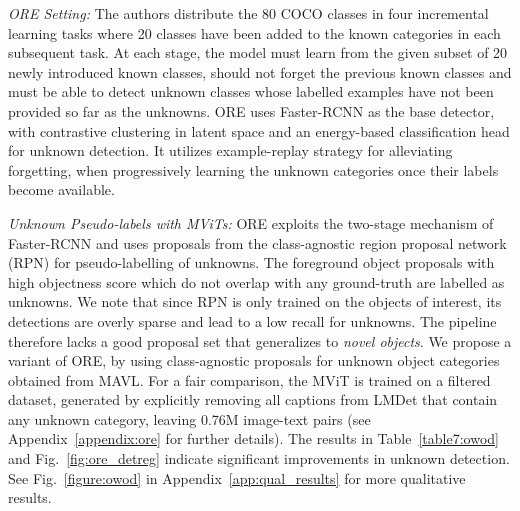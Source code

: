 \documentclass[runningheads]{llncs}
\begin{document}
\noindent
\textit{ORE Setting:} The authors distribute the 80 COCO \cite{coco} classes in four incremental learning tasks where 20 classes have been added to the known categories in each subsequent task. At each stage, the model must learn from the given subset of 20 newly introduced known classes, should not forget the previous known classes and must be able to detect unknown classes whose labelled examples have not been provided so far as the unknowns. ORE uses Faster-RCNN \cite{ren2015faster} as the base detector, with contrastive clustering in latent space and an energy-based classification head for unknown detection. It utilizes example-replay strategy \cite{wang2020frustratingly} for alleviating forgetting, when progressively learning the unknown categories once their labels become available. 

\noindent
\textit{Unknown Pseudo-labels with MViTs:} ORE exploits the two-stage mechanism of Faster-RCNN \cite{ren2015faster} and uses proposals from the class-agnostic region proposal network (RPN) for pseudo-labelling of unknowns. The foreground object proposals with high objectness score which do not overlap with any ground-truth are labelled as unknowns. We note that since RPN is only trained on the objects of interest, its detections are overly sparse and lead to a low recall for unknowns. The pipeline therefore lacks a good proposal set that generalizes to \emph{novel objects}. We propose a variant of ORE, by using class-agnostic proposals for unknown object categories obtained from MAVL. For a fair comparison, the MViT is trained on a filtered dataset, generated by explicitly removing all captions from LMDet that contain any unknown category, leaving 0.76M image-text pairs {(see Appendix~\ref{appendix:ore} for further details)}. The results in Table~\ref{table7:owod} and Fig.~\ref{fig:ore_detreg} indicate significant improvements in unknown detection. {See Fig.~\ref{figure:owod} in Appendix~\ref{app:qual_results} for more qualitative results}.
\end{document}
